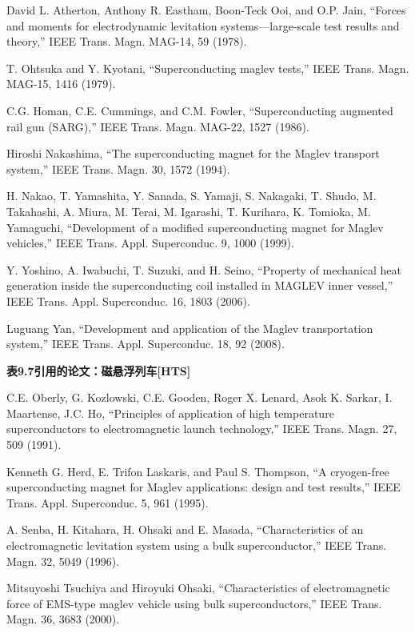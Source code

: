 \noindent [9.241] David L. Atherton, Anthony R. Eastham, Boon-Teck Ooi, and O.P. Jain, ``Forces
and moments for electrodynamic levitation systems—large-scale test results and
theory,” IEEE Trans. Magn. MAG-14, 59 (1978).

\noindent [9.242] T. Ohtsuka and Y. Kyotani, ``Superconducting maglev tests,” IEEE Trans. Magn.
MAG-15, 1416 (1979).

\noindent [9.243] C.G. Homan, C.E. Cummings, and C.M. Fowler, ``Superconducting augmented
rail gun (SARG),” IEEE Trans. Magn. MAG-22, 1527 (1986).

\noindent [9.244] Hiroshi Nakashima, ``The superconducting magnet for the Maglev transport system,”
IEEE Trans. Magn. 30, 1572 (1994).

\noindent [9.245] H. Nakao, T. Yamashita, Y. Sanada, S. Yamaji, S. Nakagaki, T. Shudo, M. Takahashi,
A. Miura, M. Terai, M. Igarashi, T. Kurihara, K. Tomioka, M. Yamaguchi,
``Development of a modified superconducting magnet for Maglev vehicles,” IEEE
Trans. Appl. Superconduc. 9, 1000 (1999).

\noindent [9.246] Y. Yoshino, A. Iwabuchi, T. Suzuki, and H. Seino, ``Property of mechanical heat
generation inside the superconducting coil installed in MAGLEV inner vessel,”
IEEE Trans. Appl. Superconduc. 16, 1803 (2006).

\noindent [9.247] Luguang Yan, ``Development and application of the Maglev transportation system,”
IEEE Trans. Appl. Superconduc. 18, 92 (2008).

\noindent \textbf{表9.7引用的论文：磁悬浮列车[HTS] }

\noindent [9.248] C.E. Oberly, G. Kozlowski, C.E. Gooden, Roger X. Lenard, Asok K. Sarkar, I.
Maartense, J.C. Ho, ``Principles of application of high temperature superconductors
to electromagnetic launch technology,” IEEE Trans. Magn. 27, 509 (1991).

\noindent [9.249] Kenneth G. Herd, E. Trifon Laskaris, and Paul S. Thompson, ``A cryogen-free
superconducting magnet for Maglev applications: design and test results,” IEEE
Trans. Appl. Superconduc. 5, 961 (1995).

\noindent [9.250] A. Senba, H. Kitahara, H. Ohsaki and E. Masada, ``Characteristics of an electromagnetic
levitation system using a bulk superconductor,” IEEE Trans. Magn.
32, 5049 (1996).

\noindent [9.251] Mitsuyoshi Tsuchiya and Hiroyuki Ohsaki, ``Characteristics of electromagnetic
force of EMS-type maglev vehicle using bulk superconductors,” IEEE Trans.
Magn. 36, 3683 (2000).


